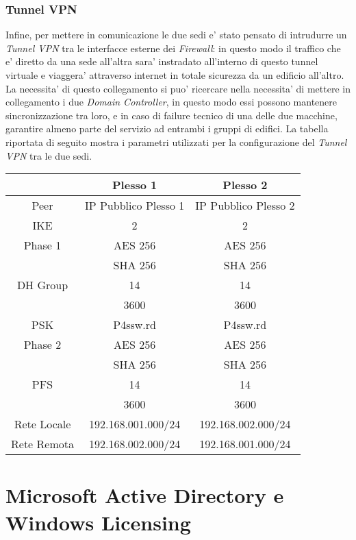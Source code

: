 \documentclass{report}
\begin{document}
			\subsection{Tunnel VPN}
				Infine, per mettere in comunicazione le due sedi e' stato pensato di intrudurre un \emph{Tunnel VPN}
				tra le interfacce esterne dei \emph{Firewall}: in questo modo il traffico che e' diretto da una sede
				all’altra sara' instradato all’interno di questo tunnel virtuale e viaggera' attraverso internet in
				totale sicurezza da un edificio all’altro. La necessita' di questo collegamento si puo' ricercare nella
				necessita' di mettere in collegamento i due \emph{Domain Controller}, in questo modo essi possono mantenere
				sincronizzazione tra loro, e in caso di failure tecnico di una delle due macchine, garantire almeno parte 
				del servizio ad entrambi i gruppi di edifici.
				La tabella riportata di seguito mostra i parametri utilizzati per la configurazione del \emph{Tunnel VPN} tra le
				due sedi.
				\begin{center}
					\begin{tabular}{ |c||c||c| }
						\hline
						& Plesso 1 & Plesso 2 \\
						\hline \hline
						Peer & IP Pubblico Plesso 1 & IP Pubblico Plesso 2 \\
						\hline
						IKE & 2 & 2 \\
						\hline
						Phase 1 & AES 256 & AES 256 \\
						& SHA 256 & SHA 256 \\
						\hline
						DH Group & 14 & 14 \\
						\hline
						& 3600 & 3600 \\
						\hline
						PSK & P4ssw.rd & P4ssw.rd \\
						\hline
						Phase 2  & AES 256 & AES 256 \\
						& SHA 256 & SHA 256 \\
						\hline
						PFS & 14 & 14 \\
						\hline
						& 3600 & 3600 \\
						\hline
						Rete Locale & 192.168.001.000/24 & 192.168.002.000/24 \\
						\hline
						Rete Remota & 192.168.002.000/24 & 192.168.001.000/24 \\
						\hline
					\end{tabular}
				\end{center}
	\chapter{Microsoft Active Directory e Windows Licensing}
	\author{Mario Catone}
\end{document}
